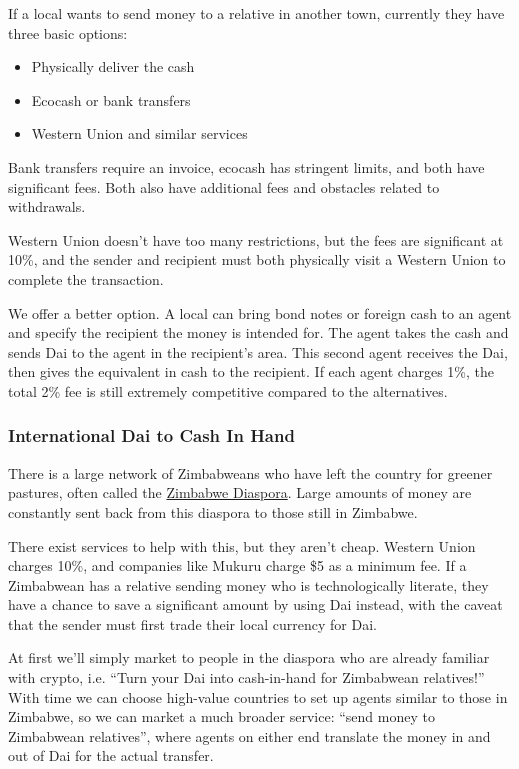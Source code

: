 \documentclass{article}
\begin{document}
If a local wants to send money to a relative in another town, currently they have three basic options:

\begin{itemize}
	\item Physically deliver the cash
	\item Ecocash or bank transfers
	\item Western Union and similar services
\end{itemize}	

Bank transfers require an invoice, ecocash has stringent limits, and both have significant fees. Both also have additional fees and obstacles related to withdrawals.

Western Union doesn't have too many restrictions, but the fees are significant at 10\%, and the sender and recipient must both physically visit a Western Union to complete the transaction.

We offer a better option. A local can bring bond notes or foreign cash to an agent and specify the recipient the money is intended for. The agent takes the cash and sends Dai to the agent in the recipient's area. This second agent receives the Dai, then gives the equivalent in cash to the recipient. If each agent charges 1\%, the total 2\% fee is still extremely competitive compared to the alternatives.

\subsubsection{International Dai to Cash In Hand} \label{remittance}

There is a large network of Zimbabweans who have left the country for greener pastures, often called the \href{https://en.wikipedia.org/wiki/Zimbabwean_diaspora}{Zimbabwe Diaspora}. Large amounts of money are constantly sent back from this diaspora to those still in Zimbabwe.

There exist services to help with this, but they aren't cheap. Western Union charges 10\%, and companies like Mukuru charge \$5 as a minimum fee. If a Zimbabwean has a relative sending money who is technologically literate, they have a chance to save a significant amount by using Dai instead, with the caveat that the sender must first trade their local currency for Dai.

At first we'll simply market to people in the diaspora who are already familiar with crypto, i.e. ``Turn your Dai into cash-in-hand for Zimbabwean relatives!'' With time we can choose high-value countries to set up agents similar to those in Zimbabwe, so we can market a much broader service: ``send money to Zimbabwean relatives'', where agents on either end translate the money in and out of Dai for the actual transfer.
\end{document}
